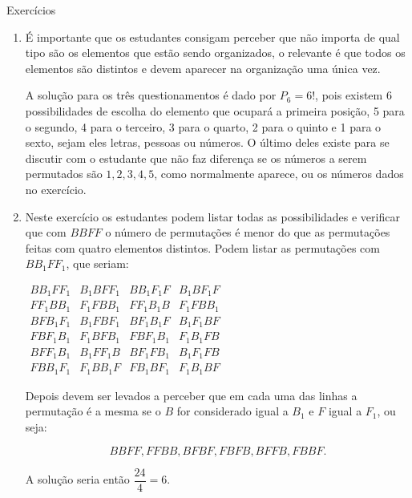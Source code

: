 \clearpage
\def\currentcolor{cor1}
\mspace{.25em}
\begin{answer}{Exercícios}
{\exerciselist
\begin{enumerate}
\item É importante que os estudantes consigam perceber que não importa de qual tipo são os  elementos que estão sendo organizados, o relevante é que todos os elementos são distintos e devem aparecer na organização uma única vez. 

A solução para os três questionamentos é dado por $P_6 =6!$, pois existem 6 possibilidades de escolha do elemento que ocupará a primeira posição, 5 para o segundo, 4 para o terceiro, 3 para o quarto, 2 para o quinto e 1 para o sexto, sejam eles letras, pessoas ou números.
O último deles existe para se discutir com o estudante que não faz diferença se os números a serem permutados são $1, 2, 3, 4, 5$, como normalmente aparece, ou os números dados no exercício.

\item Neste exercício os estudantes podem listar todas as possibilidades e verificar que com $BBFF$ o número de permutações é menor do que as permutações feitas com quatro elementos distintos. Podem listar as permutações com $BB_1FF_1$, que seriam:
\begin{table}[H]
\centering
\small

$\begin{array}{cccc} BB_1FF_1 & B_1BFF_1 & BB_1F_1F & B_1BF_1F \\ 
FF_1BB_1  & F_1FBB_1  & FF_1 B_1B  & F_1FBB_1 \\
    
BFB_1F_1 & B_1FBF_1&  BF_1B_1F& B_1F_1BF \\

FBF_1B_1  &  F_1BFB_1  &  FBF_1B_1  & F_1B_1FB \\

    BFF_1B_1  &B_1FF_1B  & BF_1FB_1  & B_1F_1FB \\
    
    FBB_1F_1  & F_1BB_1F &  FB_1BF_1 & F_1B_1BF
\end{array}$
\end{table}
Depois devem ser levados a perceber que em cada uma das linhas a permutação é a mesma se o $B$ for considerado igual a $B_1$ e $F$ igual a $F_1$, ou seja: 

\small
$$BBFF, FFBB, BFBF, FBFB, BFFB, FBBF. $$ 
\normalsize

A solução seria então $\dfrac{24}{4} =6. $


\end{enumerate}}
\end{answer}
